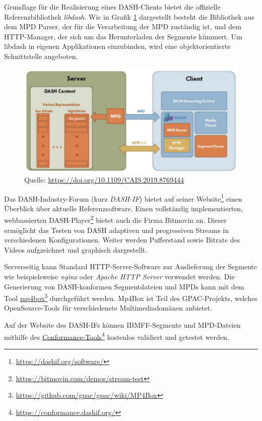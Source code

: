 \documentclass[paper = a4, fontsize = 12pt, parskip = half]{scrartcl} %
\begin{document}
Grundlage für die Realisierung eines DASH-Clients bietet die offizielle Referenzbibliothek \textit{libdash}. Wie in Grafik \ref{libdash_embedded} dargestellt besteht die Bibliothek aus dem MPD Parser, der für die Verarbeitung der MPD zuständig ist, und dem HTTP-Manager, der sich um das Herunterladen der Segmente kümmert. Um libdash in eigenen Applikationen einzubinden, wird eine objektorientierte Schnittstelle angeboten.

\begin{center}
	\begin{figure}[ht]
		\centering
		\includegraphics[width=12cm]{images/libdash_embedded.png}
		\caption{Quelle: \url{https://doi.org/10.1109/CAIS.2019.8769444}}
		\label{libdash_embedded}
	\end{figure}
\end{center}

Das DASH-Industry-Forum (kurz \textit{DASH-IF}) bietet auf seiner Website\footnote{\url{https://dashif.org/software/}} einen Überblick über aktuelle Referenzsoftware. Einen vollständig implementierten, webbassierten DASH-Player\footnote{\url{https://bitmovin.com/demos/stream-test}} bietet auch die Firma Bitmovin an. Dieser ermöglicht das Testen von DASH adaptiven und progressiven Streams in verschiedenen Konfigurationen. Weiter werden Pufferstand sowie Bitrate des Videos aufgzeichnet und graphisch dargestellt.

Serverseitig kann Standard HTTP-Server-Software zur Auslieferung der Segmente wie beispielsweise \textit{nginx} oder \textit{Apache HTTP Server} verwendet werden. Die Generierung von DASH-konformen Segmentdateien und MPDs kann mit dem Tool \hyperref{https://github.com/gpac/gpac}{}{}{mp4box}\footnote{\url{https://github.com/gpac/gpac/wiki/MP4Box}} durchgeführt werden. Mp4Box ist Teil des GPAC-Projekts, welches OpenSource-Tools für verschiedenste Multimediadomänen anbietet.

Auf der Website des DASH-IFs können IBMFF-Segmente und MPD-Dateien mithilfe des \hyperref{https://conformance.dashif.org/}{}{}{Conformance-Tools}\footnote{\url{https://conformance.dashif.org/}} kostenlos validiert und getestet werden.
\end{document}
